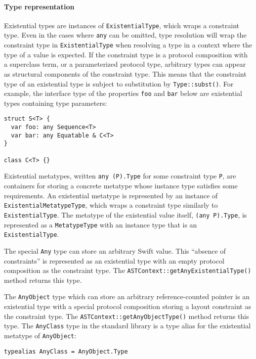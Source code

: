\documentclass[a4paper,headsepline,bibliography=totoc,toc=flat,fleqn,twoside=semi]{scrbook}
\theoremstyle{definition}
\theoremstyle{definition}
\theoremstyle{definition}
\begin{document}
\paragraph{Type representation}
Existential types are instances of \texttt{ExistentialType}, which wraps a constraint type. Even in the cases where \texttt{any} can be omitted, type resolution will wrap the constraint type in \texttt{ExistentialType} when resolving a type in a context where the type of a value is expected. If the constraint type is a protocol composition with a superclass term, or a parameterized protocol type, arbitrary types can appear as structural components of the constraint type. This means that the constraint type of an existential type is subject to substitution by \texttt{Type::subst()}. For example, the interface type of the properties \texttt{foo} and \texttt{bar} below are existential types containing type parameters:
\begin{Verbatim}
struct S<T> {
  var foo: any Sequence<T>
  var bar: any Equatable & C<T>
}

class C<T> {}
\end{Verbatim}

Existential metatypes, written \texttt{any (P).Type} for some constraint type \texttt{P}, are containers for storing a concrete metatype whose instance type satisfies some requirements. An existential metatype is represented by an instance of \texttt{ExistentialMetatypeType}, which wraps a constraint type similarly to \texttt{ExistentialType}. The metatype of the existential value itself, \texttt{(any P).Type}, is represented as a \texttt{MetatypeType} with an instance type that is an \texttt{ExistentialType}.

The special \texttt{Any} type can store an arbitrary Swift value. This ``absence of constraints'' is represented as an existential type with an empty protocol composition as the constraint type. The \texttt{ASTContext::getAnyExistentialType()} method returns this type.

The \texttt{AnyObject} type which can store an arbitrary reference-counted pointer is an existential type with a special protocol composition storing a layout constraint as the constraint type. The \texttt{ASTContext::getAnyObjectType()} method returns this type. The \texttt{AnyClass} type in the standard library is a type alias for the existential metatype of \texttt{AnyObject}:
\begin{Verbatim}
typealias AnyClass = AnyObject.Type
\end{Verbatim}
\fi
\end{document}

